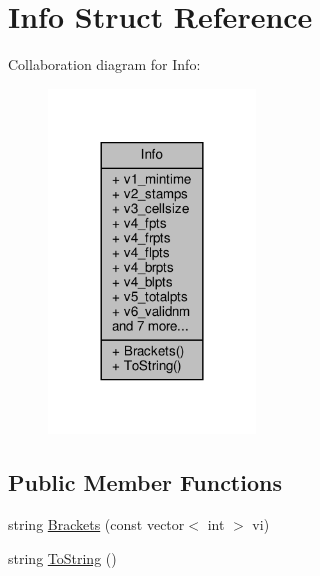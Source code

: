 \hypertarget{structInfo}{}\section{Info Struct Reference}
\label{structInfo}


Collaboration diagram for Info\+:\nopagebreak
\begin{figure}[H]
\begin{center}
\leavevmode
\includegraphics[width=156pt]{dc/d39/structInfo__coll__graph}
\end{center}
\end{figure}
\subsection*{Public Member Functions}
\begin{DoxyCompactItemize}
\item 
string \hyperlink{structInfo_a4f0c8708a9cd7b28ebb45b820d493807}{Brackets} (const vector$<$ int $>$ vi)
\item 
string \hyperlink{structInfo_a4f08e2630f96401302b19fd0367974cd}{To\+String} ()
\end{DoxyCompactItemize}
